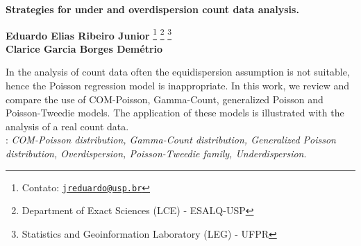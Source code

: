 \documentclass[12pt, a4paper]{article}
\begin{document}
\onehalfspacing

\begin{center}
  \textbf{
    \Large{Strategies for under and overdispersion count data analysis.}
  } \\[1em]
\end{center}

\begin{flushright}
  {\bf Eduardo Elias Ribeiro Junior}
  \footnote[$\dagger$]{Contato:
    \href{mailto:jreduardo@usp.br}{\tt jreduardo@usp.br}}
  \footnote[1]{Department of Exact Sciences (LCE) - ESALQ-USP}
  \footnote[2]{Statistics and Geoinformation Laboratory (LEG) -
    UFPR}\\
  {\bf Clarice Garcia Borges Demétrio} \footnotemark[1]
\end{flushright}

\vspace*{0.5cm}

\noindent In the analysis of count data often the equidispersion
assumption is not suitable, hence the Poisson regression model is
inappropriate. In this work, we review and compare the use of
COM-Poisson, Gamma-Count, generalized Poisson and Poisson-Tweedie
models. The application of these models is illustrated with the analysis
of a real count data.\\

:
{\it COM-Poisson distribution, Gamma-Count distribution, Generalized
  Poisson distribution, Overdispersion, Poisson-Tweedie family,
  Underdispersion}.\\
\end{document}
